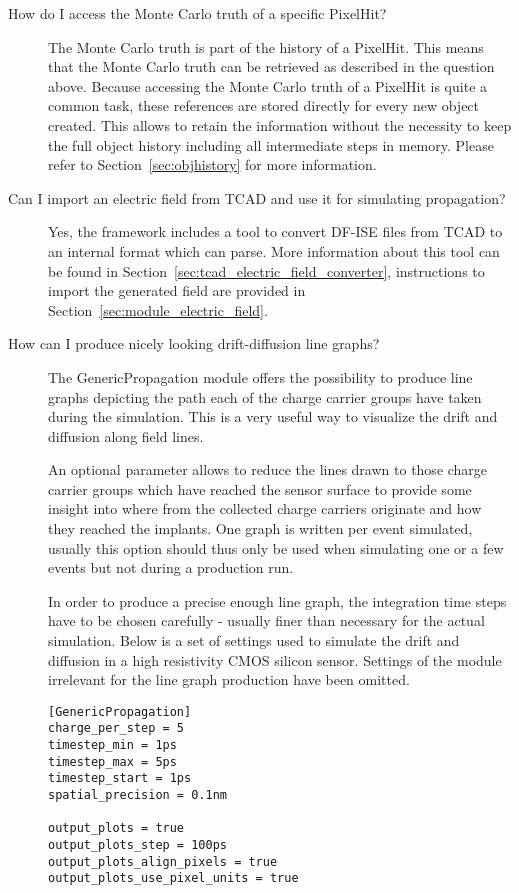 \begin{description}
\item[How do I access the Monte Carlo truth of a specific PixelHit?]
The Monte Carlo truth is part of the history of a PixelHit.
This means that the Monte Carlo truth can be retrieved as described in the question above.
Because accessing the Monte Carlo truth of a PixelHit is quite a common task, these references are stored directly for every new object created.
This allows to retain the information without the necessity to keep the full object history including all intermediate steps in memory.
Please refer to Section~\ref{sec:objhistory} for more information.
\item[Can I import an electric field from TCAD and use it for simulating propagation?]
Yes, the framework includes a tool to convert DF-ISE files from TCAD to an internal format which \apsq can parse.
More information about this tool can be found in Section~\ref{sec:tcad_electric_field_converter}, instructions to import the generated field are provided in Section~\ref{sec:module_electric_field}.
\item[How can I produce nicely looking drift-diffusion line graphs?]
The GenericPropagation module offers the possibility to produce line graphs depicting the path each of the charge carrier groups have taken during the simulation. This is a very useful way to visualize the drift and diffusion along field lines.

An optional parameter allows to reduce the lines drawn to those charge carrier groups which have reached the sensor surface to provide some insight into where from the collected charge carriers originate and how they reached the implants.
One graph is written per event simulated, usually this option should thus only be used when simulating one or a few events but not during a production run.

In order to produce a precise enough line graph, the integration time steps have to be chosen carefully - usually finer than necessary for the actual simulation. Below is a set of settings used to simulate the drift and diffusion in a high resistivity CMOS silicon sensor.
Settings of the module irrelevant for the line graph production have been omitted.

\begin{verbatim}
[GenericPropagation]
charge_per_step = 5
timestep_min = 1ps
timestep_max = 5ps
timestep_start = 1ps
spatial_precision = 0.1nm

output_plots = true
output_plots_step = 100ps
output_plots_align_pixels = true
output_plots_use_pixel_units = true


\end{verbatim}
\end{description}
